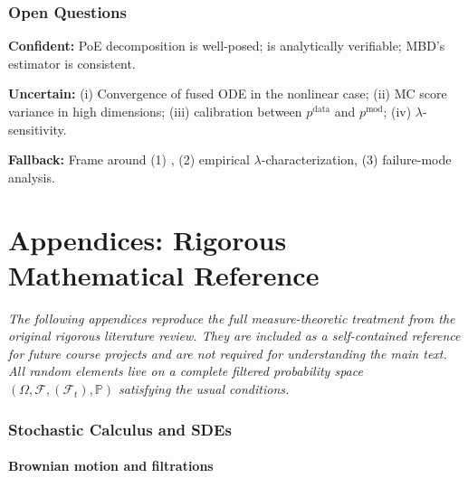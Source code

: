 \documentclass[11pt,letterpaper]{article}
\theoremstyle{plain}
\theoremstyle{definition}
\theoremstyle{remark}
\newcommand{\Prob}{\mathbb{P}}
\newcommand{\calF}{\mathcal{F}}
\begin{document}
\section{Open Questions}\label{sec:open}

\textbf{Confident:} PoE decomposition is well-posed;
 is analytically verifiable; MBD's estimator is
consistent.

\textbf{Uncertain:} (i) Convergence of fused ODE in the nonlinear case;
(ii) MC score variance in high dimensions; (iii) calibration between
$p^{\mathrm{data}}$ and $p^{\mathrm{mod}}$; (iv) $\lambda$-sensitivity.

\textbf{Fallback:} Frame around (1) , (2) empirical
$\lambda$-characterization, (3) failure-mode analysis.

\appendix
\newpage
\part*{Appendices: Rigorous Mathematical Reference}

\noindent\emph{The following appendices reproduce the full
measure-theoretic treatment from the original rigorous literature
review. They are included as a self-contained reference for future
course projects and are not required for understanding the main text.
All random elements live on a complete filtered probability space
$(\Omega,\calF,(\calF_t),\Prob)$ satisfying the usual conditions.}

\section{Stochastic Calculus and SDEs}\label{app:stoch}

\subsection{Brownian motion and filtrations}
\end{document}
